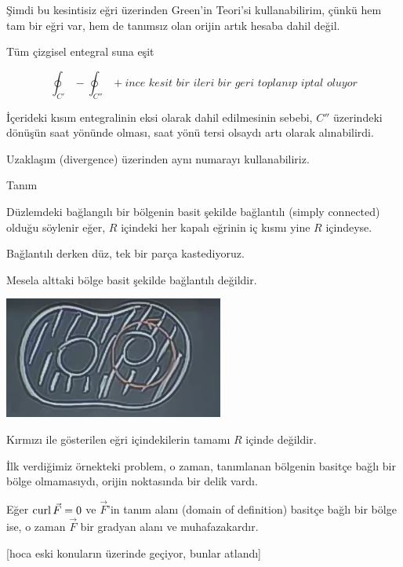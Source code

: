 \documentclass[12pt,fleqn]{article}\usepackage{../../common}
\begin{document}
Şimdi bu kesintisiz eğri üzerinden Green'in Teori'si kullanabilirim, çünkü
hem tam bir eğri var, hem de tanımsız olan orijin artık hesaba dahil
değil. 

Tüm çizgisel entegral suna eşit 

$$
\oint_{C'} - \oint_{C''} +
\textit{ince kesit bir ileri bir geri toplanıp iptal oluyor}
$$ 

İçerideki kısım entegralinin eksi olarak dahil edilmesinin sebebi, $C''$
üzerindeki dönüşün saat yönünde olması, saat yönü tersi olsaydı artı olarak
alınabilirdi. 

Uzaklaşım (divergence) üzerinden aynı numarayı kullanabiliriz. 

Tanım 

Düzlemdeki bağlangılı bir bölgenin basit şekilde bağlantılı (simply
connected) olduğu söylenir eğer, $R$ içindeki her kapalı eğrinin iç kısmı
yine $R$ içindeyse. 

Bağlantılı derken düz, tek bir parça kastediyoruz.

Mesela alttaki bölge basit şekilde bağlantılı değildir. 

\begin{center}
\includegraphics[height=4cm]{24_7.png}
\end{center}

Kırmızı ile gösterilen eğri içindekilerin tamamı $R$ içinde değildir. 

İlk verdiğimiz örnekteki problem, o zaman, tanımlanan bölgenin basitçe
bağlı bir bölge olmamasıydı, orijin noktasında bir delik vardı. 

Eğer $\operatorname{curl} \vec{F} = 0$ ve $\vec{F}$'in tanım alanı (domain of definition) 
basitçe bağlı 
bir bölge ise, o zaman $\vec{F}$ bir gradyan alanı ve muhafazakardır. 

[hoca eski konuların üzerinde geçiyor, bunlar atlandı]
\end{document}
